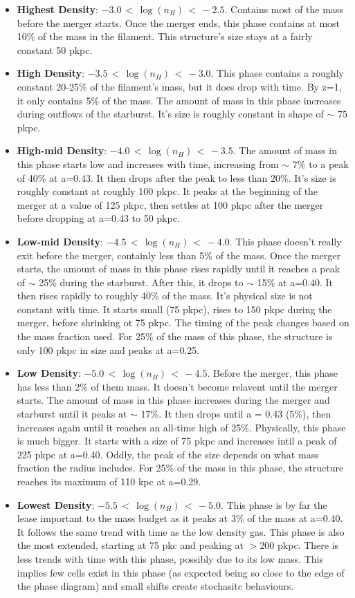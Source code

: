 \documentclass{article}
\begin{document}
\begin{itemize}
\item {\bf Highest Density}: $-3.0\,<\,\log(n_H)\,<\,-2.5$. Contains most of the
mass before the merger starts. Once the merger ends, this phase contains at most
10\% of the mass in the filament. This structure's size stays at a fairly
constant 50 pkpc. 
\item {\bf High Density}: $-3.5\,<\,\log(n_H)\,<\,-3.0$. This phase contains a
roughly constant 20-25\% of the filament's mass, but it does drop with time. By
z=1, it only contains 5\% of the mass. The amount of mass in this phase increases
during outflows of the starburst. It's size is roughly constant in shape of
$\sim$ 75 pkpc. 
\item {\bf High-mid Density}: $-4.0\,<\,\log(n_H)\,<\,-3.5$. The amount of mass
in this phase starts low and increases with time, increasing from $\sim$ 7\% to a
peak of 40\% at a=0.43. It then drops after the peak to less than 20\%. It's size
is roughly constant at roughly 100 pkpc. It peaks at the beginning of the merger
at a value of 125 pkpc, then settles at 100 pkpc after the merger before dropping
at a=0.43 to 50 pkpc. 
\item {\bf Low-mid Density}: $-4.5\,<\,\log(n_H)\,<\,-4.0$. This phase doesn't
really exit before the merger, containly less than 5\% of the mass. Once the
merger starts, the amount of mass in this phase rises rapidly until it reaches a
peak of $\sim$ 25\% during the starburst. After this, it drops to $\sim$ 15\% at
a=0.40. It then rises rapidly to roughly 40\% of the mass. It's physical size is
not constant with time. It starts small (75 pkpc), rises to 150 pkpc during the
merger, before shrinking ot 75 pkpc. The timing of the peak changes based on the
mass fraction used. For 25\% of the mass of this phase, the structure is only 100
pkpc in size and peaks at a=0.25. 
\item {\bf Low Density}: $-5.0\,<\,\log(n_H)\,<\,-4.5$. Before the merger, this
phase has less than 2\% of them mass. It doesn't become relavent until the merger
starts. The amount of mass in this phase increases during the merger and
starburst until it peaks at $\sim$ 17\%. It then drops until a = 0.43 (5\%), then
increases again until it reaches an all-time high of 25\%. Physically, this phase
is much bigger. It starts with a size of 75 pkpc and increases intil a peak of
225 pkpc at a=0.40. Oddly, the peak of the size depends on what mass fraction the
radius includes. For 25\% of the mass in this phase, the structure reaches its
maximum of 110 kpc at a=0.29. 
\item {\bf Lowest Density}: $-5.5\,<\,\log(n_H)\,<\,-5.0$. This phase is by far
the lease important to the mass budget as it peaks at 3\% of the mass at a=0.40.
It follows the same trend with time as the low density gas. This phase is also
the most extended, starting at 75 pkc and peaking at $>$200 pkpc. There is less
trends with time with this phase, possibly due to its low mass. This implies few
cells exist in this phase (as expected being so close to the edge of the phase
diagram) and small shifts create stochasitc behaviours. 
\end{itemize}
\end{document}
